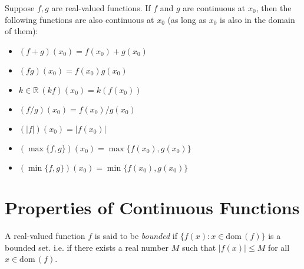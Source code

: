 \documentclass[12pt, lettersize]{book}
\theoremstyle{plain}
\theoremstyle{definition}
\theoremstyle{remark}
\newcommand{\R}{\mathbb{R}}
\newcommand{\dom}{\text{dom}\,}
\begin{document}
			\begin{tcolorbox}[title=Conclusion]
			Suppose $f,g$ are real-valued functions. If $f$ and $g$ are continuous at $x_0$, then the following functions are also continuous at $x_0$ (as long as $x_0$ is also in the domain of them):
			\begin{itemize}
				\item $(f+g)(x_0)=f(x_0)+g(x_0)$
				\item $(fg)(x_0)=f(x_0)g(x_0)$
				\item $k\in\R\ (kf)(x_0)=k(f(x_0))$
				\item $(f/g)(x_0)=f(x_0)/g(x_0)$
				\item $(|f|)(x_0)=|f(x_0)|$
				\item $(\max\{f,g\})(x_0)=\max\{f(x_0),g(x_0)\}$
				\item $(\min\{f,g\})(x_0)=\min\{f(x_0),g(x_0)\}$
			\end{itemize}
			\end{tcolorbox}
			
			
			\newpage
			
		\section{Properties of Continuous Functions}
			A real-valued function $f$ is said to be \emph{bounded} if $\{f(x): x\in\dom(f)\}$ is a bounded set. i.e. if
			there exists a real number $M$ such that $|f(x)|\leq M$ for all $x\in\dom(f)$.
			
\end{document}
